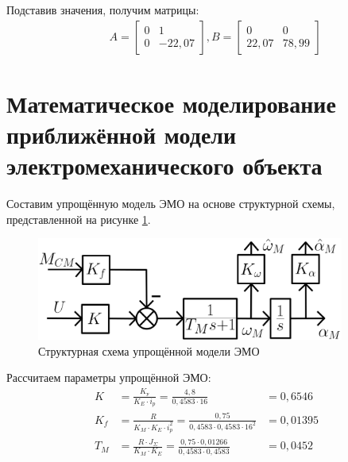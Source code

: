 \documentclass[fleqn, a4paper, 11pt, russian]{article}
\begin{document}
	Подставив значения, получим матрицы:
	\begin{align}
		&&A =
		\begin{bmatrix}
			0 & 1\\
			0 & -22,07
		\end{bmatrix}, B = 
		\begin{bmatrix}
			0 & 0\\
			22,07 & 78,99
		\end{bmatrix}
	\end{align}
	\clearpage	
	\section{Математическое моделирование приближённой модели электромеханического объекта}
	Составим упрощённую модель ЭМО на основе структурной схемы, представленной на рисунке \ref{simpScheme}.
	\begin{figure}[ht!]
		\centering
		\includegraphics[width = 0.9\textwidth]{simpScheme}
		\caption{Структурная схема упрощённой модели ЭМО}
		\label{simpScheme}
	\end{figure}
	
	Рассчитаем параметры упрощённой ЭМО:
	\begin{align}
		K &= \frac{K_\text{у}}{K_E\cdot i_p} = \frac{4,8}{0,4583 \cdot 16} &= 0,6546\\
		K_f &= \frac{R}{K_M\cdot K_E\cdot i_p^2} = \frac{0,75}{0,4583\cdot0,4583\cdot16^2} &= 0,01395\\
		T_M &= \frac{R\cdot J_\Sigma}{K_M\cdot K_E} = \frac{0,75\cdot0,01266}{0,4583\cdot0,4583} &= 0,0452
	\end{align}
	
\end{document}
